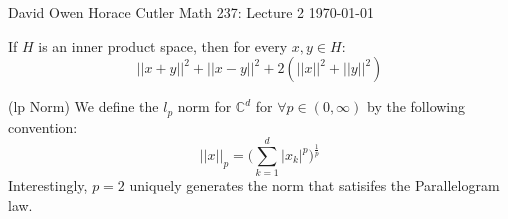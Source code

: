 \documentclass[12pt]{article}
\newenvironment{theorem}[2][Theorem]{\begin{trivlist}
\item[\hskip \labelsep {\bfseries #1}\hskip \labelsep {\bfseries #2.}]}{\end{trivlist}}
\newenvironment{example}[1][Example]{\begin{trivlist}
\item[\hskip \labelsep {\bfseries #1:}]}{\end{trivlist}}
\begin{document}
\noindent David Owen Horace Cutler \hfill {\Large Math 237: Lecture 2} \hfill \today

\begin{theorem}{(Parallelogram Law)}
    If $H$ is an inner product space, then for every $x, y \in H$:
    \begin{equation}
        ||x + y||^2 + ||x - y||^2 + 2(||x||^2 + ||y||^2)
    \end{equation}
\end{theorem}

\begin{example}{(lp Norm)}
    We define the $l_p$ norm for $\mathbb{C}^d$ for $\forall p \in (0, \infty)$ by the following convention:
    \begin{equation}
        ||x||_p = \Big ( \sum_{k = 1}^d |x_k|^p \Big )^{\frac{1}{p}}
    \end{equation}
    Interestingly, $p = 2$ uniquely generates the norm that satisifes the Parallelogram law. 
\end{example}
\end{document}
